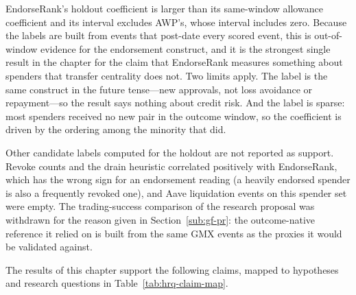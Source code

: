 EndorseRank's holdout coefficient is larger than its same-window allowance coefficient and its interval excludes AWP's, whose interval includes zero. Because the labels are built from events that post-date every scored event, this is out-of-window evidence for the endorsement construct, and it is the strongest single result in the chapter for the claim that EndorseRank measures something about spenders that transfer centrality does not. Two limits apply. The label is the same construct in the future tense---new approvals, not loss avoidance or repayment---so the result says nothing about credit risk. And the label is sparse: most spenders received no new pair in the outcome window, so the coefficient is driven by the ordering among the minority that did.

Other candidate labels computed for the holdout are not reported as support. Revoke counts and the drain heuristic correlated positively with EndorseRank, which has the wrong sign for an endorsement reading (a heavily endorsed spender is also a frequently revoked one), and Aave liquidation events on this spender set were empty. The trading-success comparison of the research proposal was withdrawn for the reason given in Section~\ref{sub:gf-pr}: the outcome-native reference it relied on is built from the same GMX events as the proxies it would be validated against.


The results of this chapter support the following claims, mapped to hypotheses and research questions in Table~\ref{tab:hrq-claim-map}.

